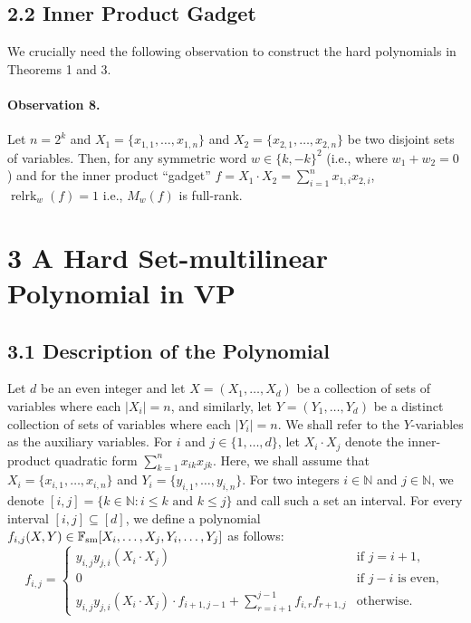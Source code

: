 \documentclass[10pt,a4paper]{article}
\begin{document}
\subsection*{2.2 Inner Product Gadget}
We crucially need the following observation to construct the hard polynomials in Theorems 1 and 3.
\paragraph{Observation 8.} Let $n=2^k$ and $X_1=\{x_{1,1},\ldots,x_{1,n}\}$ and $X_2=\{x_{2,1},\ldots,x_{2,n}\}$ be two disjoint sets of variables. Then, for any symmetric word $w\in\{k,-k\}^2$ (i.e., where $w_1+w_2=0$) and for the inner product ``gadget'' $f=X_1\cdot X_2=\sum_{i=1}^n x_{1,i}x_{2,i}$, $\operatorname{relrk}_w(f)=1$ i.e., $M_w(f)$ is full-rank.
\section*{3 A Hard Set-multilinear Polynomial in VP}
\subsection*{3.1 Description of the Polynomial}
Let $d$ be an even integer and let $X=(X_1,\ldots,X_d)$ be a collection of sets of variables where each $|X_i|=n$, and similarly, let $Y=(Y_1,\ldots,Y_d)$ be a distinct collection of sets of variables where each $|Y_i|=n$. We shall refer to the $Y$-variables as the auxiliary variables. For $i$ and $j\in\{1,\ldots,d\}$, let $X_i\cdot X_j$ denote the inner-product quadratic form $\sum_{k=1}^n x_{ik}x_{jk}$. Here, we shall assume that $X_i=\{x_{i,1},\ldots,x_{i,n}\}$ and $Y_i=\{y_{i,1},\ldots,y_{i,n}\}$.
For two integers $i\in\mathbb N$ and $j\in\mathbb N$, we denote $[i,j]=\{k\in\mathbb N:i\leq k\text{ and }k\leq j\}$ and call such a set an interval. For every interval $[i,j]\subseteq[d]$, we define a polynomial $f_{i,j}(X,Y)\in\mathbb F_{\rm sm}[X_i,\ldots,X_j,Y_i,\ldots,Y_j]$ as follows:
\[f_{i,j}=\begin{cases}
y_{i,j}y_{j,i}(X_i\cdot X_j)&\text{if }j=i+1,\\
0&\text{if }j-i\text{ is even},\\
y_{i,j}y_{j,i}(X_i\cdot X_j)\cdot f_{i+1,j-1}+\displaystyle\sum_{r=i+1}^{j-1} f_{i,r}f_{r+1,j}&\text{otherwise}.
\end{cases}\]
\end{document}
